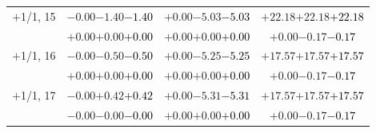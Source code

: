 \documentclass[compress]{beamer}
\begin{document}
\begin{frame}
\begin{tabular}{r | c | c | c}
$+$1/1, 15 & $-0.00$\hspace{0.1 cm}$-1.40$\hspace{0.1 cm}\textcolor{black}{$-1.40$} & $+0.00$\hspace{0.1 cm}$-5.03$\hspace{0.1 cm}\textcolor{black}{$-5.03$} & $+22.18$\hspace{0.1 cm}$+22.18$\hspace{0.1 cm}\textcolor{black}{$+22.18$} \\
           & $+0.00$\hspace{0.1 cm}$+0.00$\hspace{0.1 cm}\textcolor{black}{$+0.00$} & $+0.00$\hspace{0.1 cm}$+0.00$\hspace{0.1 cm}\textcolor{black}{$+0.00$} & $+0.00$\hspace{0.1 cm}$-0.17$\hspace{0.1 cm}\textcolor{black}{$-0.17$} \\
$+$1/1, 16 & $-0.00$\hspace{0.1 cm}$-0.50$\hspace{0.1 cm}\textcolor{black}{$-0.50$} & $+0.00$\hspace{0.1 cm}$-5.25$\hspace{0.1 cm}\textcolor{black}{$-5.25$} & $+17.57$\hspace{0.1 cm}$+17.57$\hspace{0.1 cm}\textcolor{black}{$+17.57$} \\
           & $+0.00$\hspace{0.1 cm}$+0.00$\hspace{0.1 cm}\textcolor{black}{$+0.00$} & $+0.00$\hspace{0.1 cm}$+0.00$\hspace{0.1 cm}\textcolor{black}{$+0.00$} & $+0.00$\hspace{0.1 cm}$-0.17$\hspace{0.1 cm}\textcolor{black}{$-0.17$} \\
$+$1/1, 17 & $-0.00$\hspace{0.1 cm}$+0.42$\hspace{0.1 cm}\textcolor{black}{$+0.42$} & $+0.00$\hspace{0.1 cm}$-5.31$\hspace{0.1 cm}\textcolor{black}{$-5.31$} & $+17.57$\hspace{0.1 cm}$+17.57$\hspace{0.1 cm}\textcolor{black}{$+17.57$} \\
           & $-0.00$\hspace{0.1 cm}$-0.00$\hspace{0.1 cm}\textcolor{black}{$-0.00$} & $+0.00$\hspace{0.1 cm}$+0.00$\hspace{0.1 cm}\textcolor{black}{$+0.00$} & $+0.00$\hspace{0.1 cm}$-0.17$\hspace{0.1 cm}\textcolor{black}{$-0.17$} \\

\end{tabular}
\end{frame}
\end{document}
